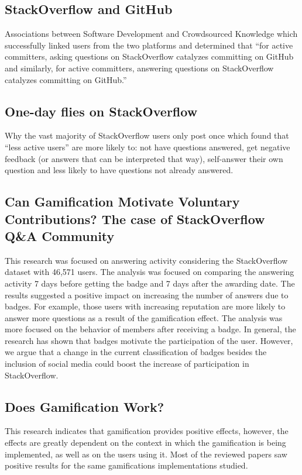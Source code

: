 \documentclass{sigchi}
\begin{document}
\subsection{StackOverflow and GitHub}

Associations between Software Development and Crowdsourced Knowledge which
successfully linked users from the two platforms and determined that “for
active committers, asking questions on StackOverflow catalyzes committing on
GitHub and similarly, for active committers, answering questions on
StackOverflow catalyzes committing on GitHub.”

\subsection{One-day flies on StackOverflow}

Why the vast majority of StackOverflow users only post once which found that
“less active users” are more likely to: not have questions answered, get
negative feedback (or answers that can be interpreted that way), self-answer
their own question and less likely to have questions not already answered.

\subsection{Can Gamification Motivate Voluntary Contributions? The case of
StackOverflow Q\&A Community}

This research was focused on answering activity considering the StackOverflow 
dataset with 46,571 users. The analysis was focused on comparing the answering
activity 7 days before getting the badge and 7 days after the awarding date.
The results suggested a positive impact on increasing the number of answers due
to badges. For example, those users with increasing reputation are more likely to 
answer more questions as a result of the gamification effect. The analysis was 
more focused on the behavior of members after receiving a badge. In general, 
the research has shown that badges motivate the participation of the user. However, 
we argue that a change in the current classification of badges besides the 
inclusion of social  media could boost the increase of participation in 
StackOverflow.

\subsection{Does Gamification Work?}

This research indicates that gamification provides positive effects, however,
the effects are greatly dependent on the context in which the gamification is
being implemented, as well as on the users using it. Most of the reviewed
papers saw positive results for the same gamifications implementations studied.
\end{document}
